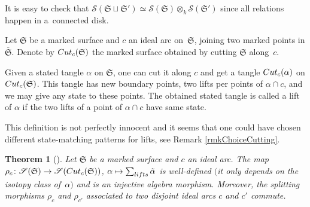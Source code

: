 \documentclass[11pt]{article}
\numberwithin{equation}{section}
\numberwithin{equation}{section}
\newtheorem{Theorem}{Theorem}[section]
\begin{document}
\begin{Remark}
It is easy to check that $\mathscr{S}(\mathfrak{S} \sqcup \mathfrak{S}') \simeq \mathscr{S}(\mathfrak{S}) \otimes_k \mathscr{S}(\mathfrak{S}')$ since all relations happen in a~connected disk.
\end{Remark}

\begin{Definition} 
Let $\mathfrak{S}$ be a marked surface and $c$ an ideal arc on~$\mathfrak{S}$, joining two marked points in $\overline{\mathfrak{S}}$. Denote by ${\rm Cut}_c(\mathfrak{S})$ the marked surface obtained by cutting $\mathfrak{S}$ along~$c$.

Given a stated tangle $\alpha$ on $\mathfrak{S}$, one can cut it along $c$ and get a tangle ${\rm Cut}_c(\alpha)$ on ${\rm Cut}_c(\mathfrak{S})$. This tangle has new boundary points, two lifts per points of $\alpha \cap c$, and we may give any state to these points. The obtained stated tangle is called a lift of $\alpha$ if the two lifts of a point of $\alpha \cap c$ have same state.
\end{Definition}

This definition is not perfectly innocent and it seems that one could have chosen different state-matching patterns for lifts, see Remark \ref{rmkChoiceCutting}.

\begin{Theorem}[{\cite[Theorem~3.1]{TTQLe}}]\label{splitmorph} Let $\mathfrak{S}$ be a marked surface and $c$ an ideal arc. The map $\rho_c\colon \mathscr{S}(\mathfrak{S}) \to \mathscr{S}({\rm Cut}_c(\mathfrak{S}))$, $\alpha \mapsto \sum_{\rm lifts} \tilde{\alpha}$ is well-defined $($it only depends on the isotopy class of~$\alpha)$ and is an injective algebra morphism. Moreover, the splitting morphisms $\rho_c$ and $\rho_{c'}$ associated to two disjoint ideal arcs $c$ and $c'$ commute.
\end{Theorem}
\end{document}
